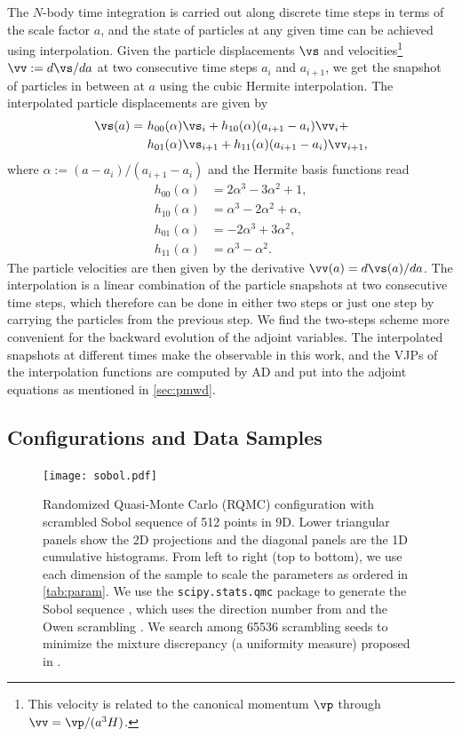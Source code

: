 \documentclass[modern, trackchanges, dvipsnames]{aastex631}
\renewcommand{\d}{d}
\begin{document}
The $N$-body time integration is carried out along discrete time steps
in terms of the scale factor $a$, and the state of particles at any
given time can be achieved using interpolation.
Given the particle displacements $\vs$ and velocities\footnote{This
velocity is related to the canonical momentum $\vp$ through $\vv =
\vp/(a^3H)$.} $\vv := \d\vs/\d a$ at two consecutive time steps $a_i$ and
$a_{i+1}$, we get the snapshot of particles in between at $a$ using the
cubic Hermite interpolation.
The interpolated particle displacements are given by
\begin{align}
  \vs(a) =\ &h_{00}(\alpha)\vs_i + h_{10}(\alpha)(a_{i+1} - a_i)\vv_i + \nonumber\\
           &h_{01}(\alpha)\vs_{i+1} + h_{11}(\alpha)(a_{i+1} - a_i)\vv_{i+1},
\end{align}
where $\alpha := (a - a_i)/(a_{i+1} - a_i)$ and the Hermite basis
functions read
\begin{align}
  h_{00}(\alpha) &= 2\alpha^3 - 3\alpha^2 + 1, \nonumber\\
  h_{10}(\alpha) &= \alpha^3 - 2\alpha^2 + \alpha, \nonumber\\
  h_{01}(\alpha) &= -2\alpha^3 + 3\alpha^2, \nonumber\\
  h_{11}(\alpha) &= \alpha^3 - \alpha^2.
\end{align}
The particle velocities are then given by the derivative $\vv(a) =
\d\vs(a) / \d a$.
The interpolation is a linear combination of the particle snapshots at
two consecutive time steps, which therefore can be done in either two
steps or just one step by carrying the particles from the previous step.
We find the two-steps scheme more convenient for the backward evolution
of the adjoint variables.
The interpolated snapshots at different times make the observable in
this work, and the VJPs of the interpolation functions are computed by
AD and put into the adjoint equations as mentioned in
\autoref{sec:pmwd}.


\vspace{1em}
\subsection{Configurations and Data Samples}

\begin{figure}
  \centering
  \texttt{[image: sobol.pdf]}
  \caption{Randomized Quasi-Monte Carlo (RQMC) configuration with
    scrambled Sobol sequence of 512 points in 9D.
    Lower triangular panels show the 2D projections and the diagonal
    panels are the 1D cumulative histograms.
    From left to right (top to bottom), we use each dimension of the
    sample to scale the parameters as ordered in \autoref{tab:param}.
    We use the \texttt{scipy.stats.qmc} package \citep{SciPy} to
    generate the Sobol sequence \citep{Sobol1967}, which uses the
    direction number from \citet{JoeKuo2008} and the Owen scrambling
    \citep{Owen1998}.
    We search among 65536 scrambling seeds to minimize the mixture
    discrepancy (a uniformity measure) proposed in \citet{Zhou2013MD}.
  }
  \label{fig:sobol}
\end{figure}
\end{document}
